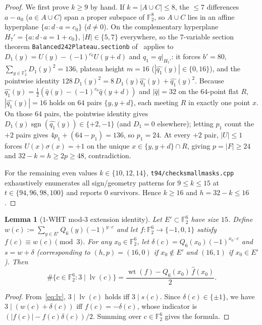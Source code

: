 \documentclass[11pt]{article}
\newtheorem{lemma}[theorem]{Lemma}
\theoremstyle{definition}
\theoremstyle{remark}
\newcommand{\F}{\mathbb{F}}
\newcommand{\wt}{\operatorname{wt}}
\newcommand{\code}[1]{\texttt{#1}}
\DeclareRobustCommand{\_}{\textunderscore\allowbreak}
\newcommand{\main}{\cite{Main}}
\begin{document}
\begin{proof}
We first prove $k\ge9$ by hand. If $k=|A\cup C|\le8$, the $\le7$ differences $a-a_0$ ($a\in A\cup C$) span a proper subspace of $\F_2^8$, so $A\cup C$ lies in an affine hyperplane $\{a:d\cdot a=c_0\}$ ($d\neq0$). On the complementary hyperplane $H_7'=\{a:d\cdot a=1+c_0\}$, $|H|\in\{5,7\}$ everywhere, so the $7$-variable section theorem \code{Balanced242Plateau.section\_0\_b\_0} of~\main{} applies to $D_1(y)=U(y)-(-1)^{c_0}U(y+d)$ and $q_1=q|_{H_7'}$: it forces $b'=80$, $\sum_{y\in\F_2^7}D_1(y)^2=136$, plateau height $m=16$ ($|\widehat{q_1}(y)|\in\{0,16\}$), and the pointwise identity $128\,D_1(y)^2=8\,D_1(y)\widehat{q_1}(y)+\widehat{q_1}(y)^2$. Because $\widehat{q_1}(y)=\tfrac12(\widehat q(y)-(-1)^{c_0}\widehat q(y+d))$ and $|\widehat q|=32$ on the $64$-point flat $R$, $|\widehat{q_1}(y)|=16$ holds on $64$ pairs $\{y,y+d\}$, each meeting $R$ in exactly one point $x$. On those $64$ pairs, the pointwise identity gives $D_1(y)\operatorname{sgn}(\widehat{q_1}(y))\in\{+2,-1\}$ (and $D_1=0$ elsewhere); letting $p_1$ count the $+2$ pairs gives $4p_1+(64-p_1)=136$, so $p_1=24$. At every $+2$ pair, $|U|\le1$ forces $U(x)\sigma(x)=+1$ on the unique $x\in\{y,y+d\}\cap R$, giving $p=|F|\ge24$ and $32-k=h\ge2p\ge48$, contradiction.

For the remaining even values $k\in\{10,12,14\}$, \code{t94/check\_small\_masks.cpp} exhaustively enumerates all sign/geometry patterns for $9\le k\le15$ at $t\in\{94,96,98,100\}$ and reports $0$ survivors. Hence $k\ge16$ and $h=32-k\le16$.
\end{proof}

\begin{lemma}[$1$-WHT mod-$3$ extension identity]\label{lem:mod3-ext}
Let $E'\subset\F_2^6$ have size $15$. Define $w(c):=\sum_{y\in E'}Q_6(y)(-1)^{y\cdot c}$ and let $f:\F_2^6\to\{-1,0,1\}$ satisfy $f(c)\equiv w(c)\pmod 3$. For any $x_0\in\F_2^6$, let $\delta(c)=Q_6(x_0)(-1)^{x_0\cdot c}$ and $s=w+\delta$ (corresponding to $(h,p)=(16,0)$ if $x_0\notin E'$ and $(16,1)$ if $x_0\in E'$). Then
\[
  \#\{c\in\F_2^6:3\mid\operatorname{lv}(c)\}=\frac{\wt(f)-Q_6(x_0)\,\widehat f(x_0)}{2}.
\]
\end{lemma}

\begin{proof}
From~\eqref{eq:lv}, $3\mid\operatorname{lv}(c)$ holds iff $3\mid s(c)$. Since $\delta(c)\in\{\pm1\}$, we have $3\mid(w(c)+\delta(c))$ iff $f(c)=-\delta(c)$, whose indicator is $(|f(c)|-f(c)\delta(c))/2$. Summing over $c\in\F_2^6$ gives the formula.
\end{proof}
\end{document}
